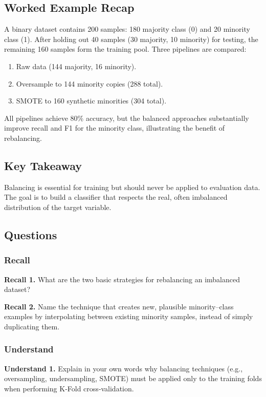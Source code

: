 \documentclass[12pt, a4paper]{article}
\begin{document}
\subsection{Worked Example Recap}
A binary dataset contains 200 samples: 180 majority class (0) and 20 minority class (1).  
After holding out 40 samples (30 majority, 10 minority) for testing, the remaining 160 samples form the training pool.  
Three pipelines are compared:
\begin{enumerate}
    \item Raw data (144 majority, 16 minority).
    \item Oversample to 144 minority copies (288 total).
    \item SMOTE to 160 synthetic minorities (304 total).
\end{enumerate}
All pipelines achieve 80\% accuracy, but the balanced approaches substantially improve recall and F1 for the minority class, illustrating the benefit of rebalancing.

\subsection{Key Takeaway}
Balancing is essential for training but should never be applied to evaluation data. The goal is to build a classifier that respects the real, often imbalanced distribution of the target variable.

\subsection{Questions}
\subsubsection{Recall}
\textbf{Recall 1.} What are the two basic strategies for rebalancing an imbalanced dataset?  

\textbf{Recall 2.} Name the technique that creates new, plausible minority–class examples by interpolating between existing minority samples, instead of simply duplicating them.  

\newpage
\subsubsection{Understand}
\textbf{Understand 1.} Explain in your own words why balancing techniques (e.g., oversampling, undersampling, SMOTE) must be applied only to the training folds when performing K‑Fold cross‑validation.  
\end{document}
